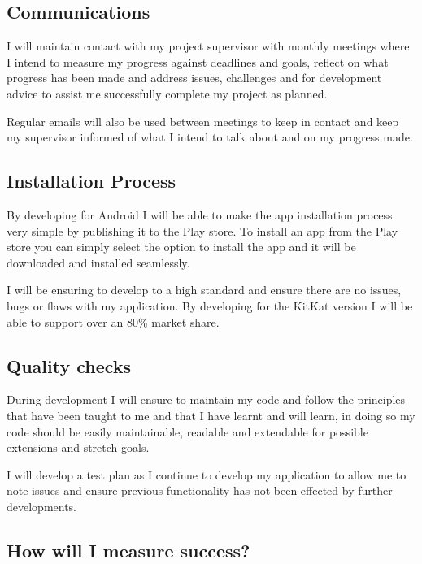 \subsection{Communications}\label{communications}

I will maintain contact with my project supervisor with monthly meetings
where I intend to measure my progress against deadlines and goals,
reflect on what progress has been made and address issues, challenges
and for development advice to assist me successfully complete my project
as planned.

Regular emails will also be used between meetings to keep in contact and
keep my supervisor informed of what I intend to talk about and on my
progress made.

\subsection{Installation Process}\label{installation-process}

By developing for Android I will be able to make the app installation
process very simple by publishing it to the Play store. To install an
app from the Play store you can simply select the option to install the
app and it will be downloaded and installed seamlessly.

I will be ensuring to develop to a high standard and ensure there are no
issues, bugs or flaws with my application. By developing for the KitKat
version I will be able to support over an 80\% market share.
\cite{androidversion}

\subsection{Quality checks}\label{quality-checks}

During development I will ensure to maintain my code and follow the
principles that have been taught to me and that I have learnt and will
learn, in doing so my code should be easily maintainable, readable and
extendable for possible extensions and stretch goals.

I will develop a test plan as I continue to develop my application to
allow me to note issues and ensure previous functionality has not been
effected by further developments.

\subsection{How will I measure
success?}\label{how-will-i-measure-success}

